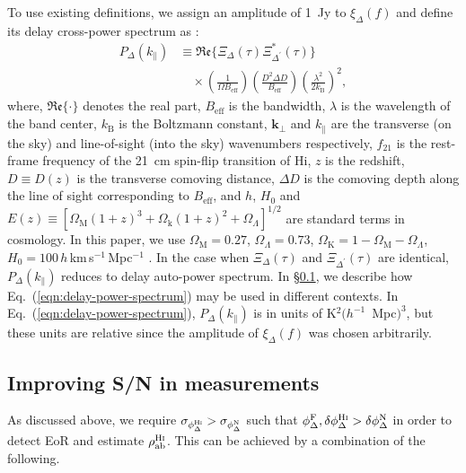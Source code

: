 \documentclass[
reprint,
superscriptaddress,
amsmath,
amssymb,
aps,
prd
]{revtex4-1}
\begin{document}
To use existing definitions, we assign an amplitude of 1~Jy to $\xi_\Delta(f)$ and define its delay cross-power spectrum as \cite{par12a,thy15a}:
\begin{align}
  P_\Delta(k_\parallel) &\equiv \mathfrak{Re}\bigg\{\Xi_\Delta(\tau)\Xi_{\Delta^\prime}^*(\tau)\bigg\} \nonumber\\
  &\quad \times \left(\frac{1}{\Omega B_\textrm{eff}}\right)\left(\frac{D^2\Delta D}{B_\textrm{eff}}\right)\left(\frac{\lambda^2}{2k_\textrm{B}}\right)^2, \label{eqn:delay-power-spectrum}
\end{align}
where, $\mathfrak{Re}\{\cdot\}$ denotes the real part, $B_\textrm{eff}$ is the bandwidth, $\lambda$ is the wavelength of the band center, $k_\textrm{B}$ is the Boltzmann constant, $\boldsymbol{k}_\perp$ and $k_\parallel$ are the transverse (on the sky) and line-of-sight (into the sky) wavenumbers respectively, $f_{21}$ is the rest-frame frequency of the 21~cm spin-flip transition of H{\sc i}, $z$ is the redshift, $D\equiv D(z)$ is the transverse comoving distance, $\Delta D$ is the comoving depth along the line of sight corresponding to $B_\textrm{eff}$, and $h$, $H_0$ and $E(z)\equiv [\Omega_\textrm{M}(1+z)^3+\Omega_\textrm{k}(1+z)^2+\Omega_\Lambda]^{1/2}$ are standard terms in cosmology. In this paper, we use $\Omega_\textrm{M}=0.27$, $\Omega_\Lambda=0.73$, $\Omega_\textrm{K}=1-\Omega_\textrm{M}-\Omega_\Lambda$, $H_0=100\,h\,$km$\,$s$^{-1}\,$Mpc$^{-1}$ \cite{wmap9cosmo}. In the case when $\Xi_\Delta(\tau)$ and $\Xi_{\Delta^\prime}(\tau)$ are identical, $P_\Delta(k_\parallel)$ reduces to delay auto-power spectrum. In \S\ref{sec:averaging}, we describe how Eq.~(\ref{eqn:delay-power-spectrum}) may be used in different contexts. In Eq.~(\ref{eqn:delay-power-spectrum}), $P_\Delta(k_\parallel)$ is in units of K$^2 (h^{-1}$~Mpc$)^3$, but these units are relative since the amplitude of $\xi_\Delta(f)$ was chosen arbitrarily. 

\subsection{Improving S/N in measurements}\label{sec:averaging}

As discussed above, we require $\sigma_{\phi_\Delta^\textrm{H{\sc i}}} > \sigma_{\phi_\Delta^\textrm{N}}$ such that $\phi_\Delta^\textrm{F}, \delta\phi_\Delta^\textrm{H{\sc i}} > \delta\phi_\Delta^\textrm{N}$ in order to detect EoR and estimate $\rho_\textrm{ab}^\textrm{H{\sc i}}$. This can be achieved by a combination of the following.
\end{document}

